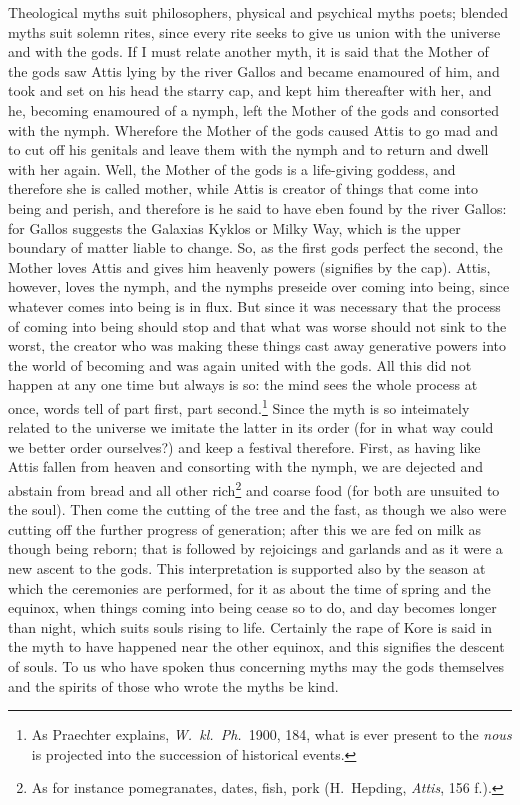 \documentclass[12pt]{article}
\begin{document}
Theological myths suit philosophers, physical and psychical
myths poets; blended myths suit solemn rites, since
every rite seeks to give us union with the universe and with
the gods. If I must relate another myth, it is said that the
Mother of the gods saw Attis lying by the river Gallos and
became enamoured of him, and took and set on his head
the starry cap, and kept him thereafter with her, and he,
becoming enamoured of a nymph, left the Mother of the
gods and consorted with the nymph. Wherefore the Mother
of the gods caused Attis to go mad and to cut off his genitals
and leave them with the nymph and to return and dwell
with her again. Well, the Mother of the gods is a life-giving
goddess, and therefore she is called mother, while Attis is
creator of things that come into being and perish, and
therefore is he said to have eben found by the river Gallos:
for Gallos suggests the Galaxias Kyklos or Milky Way,
which is the upper boundary of matter liable to change.
So, as the first gods perfect the second, the Mother loves
Attis and gives him heavenly powers (signifies by the cap).
Attis, however, loves the nymph, and the nymphs preseide
over coming into being, since whatever comes into being is
in flux. But since it was necessary that the process of coming
into being should stop and that what was worse should
not sink to the worst, the creator who was making these
things cast away generative powers into the world of
becoming and was again united with the gods. All this did
not happen at any one time but always is so: the mind sees
the whole process at once, words tell of part first, part second.\footnote{As
Praechter explains, \textit{W.~kl.~Ph.}~1900, 184, what is ever present
to the \textit{nous} is projected into the succession of historical events.}
Since the myth is so inteimately related to the universe we
imitate the latter in its order (for in what way could we
better order ourselves?) and keep a festival therefore. First,
as having like Attis fallen from heaven and consorting with
the nymph, we are dejected and abstain from bread and all
other rich\footnote{As for instance pomegranates, dates, fish, pork
(H.~Hepding, \textit{Attis}, 156 f.).} and coarse food (for both are unsuited
to the soul). Then come the cutting of the tree and the fast, as
though we also were cutting off the further progress of
generation; after this we are fed on milk as though being
reborn; that is followed by rejoicings and garlands and as
it were a new ascent to the gods. This interpretation is
supported also by the season at which the ceremonies are
performed, for it as about the time of spring and the equinox,
when things coming into being cease so to do, and day
becomes longer than night, which suits souls rising to life.
Certainly the rape of Kore is said in the myth to have
happened near the other equinox, and this signifies the
descent of souls. To us who have spoken thus concerning
myths may the gods themselves and the spirits of those who
wrote the myths be kind.
\end{document}
